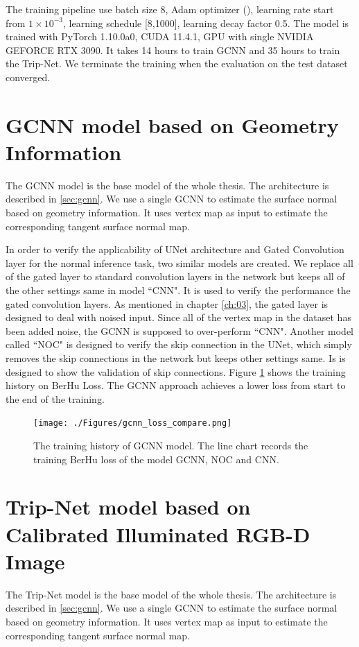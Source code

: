 \documentclass[border=15pt, multi, tikz]{article}
\begin{document}
The training pipeline use batch size $ 8 $,  Adam optimizer (\cite{adam}), learning rate start from  $ 1\times10^{-3} $, learning schedule [8,1000], learning decay factor 0.5. The model is trained with PyTorch 1.10.0a0, CUDA 11.4.1, GPU with single NVIDIA GEFORCE RTX 3090. It takes 14 hours to train GCNN and 35 hours to train the Trip-Net. We terminate the training when the evaluation on the test dataset converged.


\section{GCNN model based on Geometry Information}
The GCNN model is the base model of the whole thesis. The architecture is described in \ref{sec:gcnn}. We use a single GCNN to estimate the surface normal based on geometry information. It uses vertex map as input to estimate the corresponding tangent surface normal map. 

In order to verify the applicability of UNet architecture and Gated Convolution layer for the normal inference task, two similar models are created. 
We replace all of the gated layer to standard convolution layers in the network but keeps all of the other settings same in model ``CNN". It is used to verify the performance the gated convolution layers. As mentioned in chapter \ref{ch:03}, the gated layer is designed to deal with noised input. Since all of the vertex map in the dataset has been added noise, the GCNN is supposed to over-perform ``CNN". Another model called ``NOC" is designed to verify the skip connection in the UNet, which simply removes the skip connections in the network but keeps other settings same. Is is designed to show the validation of skip connections. Figure \ref{fig:gcnn-training-history} shows the training history on BerHu Loss. The GCNN approach achieves a lower loss from start to the end of the training.

\begin{figure}[th]
	\centering
	\texttt{[image: ./Figures/gcnn\_loss\_compare.png]}
	\caption{The training history of GCNN model. The line chart records the training BerHu loss of the model GCNN, NOC and CNN.}
	\label{fig:gcnn-training-history}
\end{figure}

\section{Trip-Net model based on Calibrated Illuminated RGB-D Image}
The Trip-Net model is the base model of the whole thesis. The architecture is described in \ref{sec:gcnn}. We use a single GCNN to estimate the surface normal based on geometry information. It uses vertex map as input to estimate the corresponding tangent surface normal map. 
\end{document}
